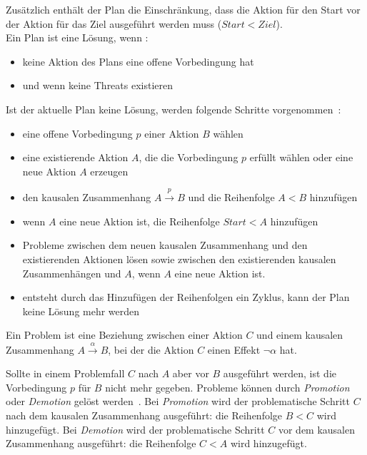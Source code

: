 Zusätzlich enthält der Plan die Einschränkung, dass die Aktion für den Start vor der Aktion für das Ziel ausgeführt werden muss ($Start < Ziel$).\\
Ein Plan ist eine Lösung, wenn \cite{grastien}:
\begin{itemize}
    \item keine Aktion des Plans eine offene Vorbedingung hat
    \item und wenn keine Threats existieren
\end{itemize}
Ist der aktuelle Plan keine Lösung, werden folgende Schritte vorgenommen~\cite{grastien}:
\begin{itemize}
    \item eine offene Vorbedingung $p$ einer Aktion $B$ wählen
    \item eine existierende Aktion $A$, die die Vorbedingung $p$ erfüllt wählen oder eine neue Aktion $A$ erzeugen
    \item den kausalen Zusammenhang $A \xrightarrow{p} B$ und die Reihenfolge $A < B$ hinzufügen
    \item wenn $A$ eine neue Aktion ist, die Reihenfolge $Start < A$ hinzufügen
    \item Probleme zwischen dem neuen kausalen Zusammenhang und den existierenden Aktionen lösen sowie zwischen den existierenden kausalen Zusammenhängen und $A$, wenn $A$ eine neue Aktion ist.
    \item entsteht durch das Hinzufügen der Reihenfolgen ein Zyklus, kann der Plan keine Lösung mehr werden
\end{itemize}
\begin{definition}
    Ein Problem ist eine Beziehung zwischen einer Aktion $C$ und einem kausalen Zusammenhang  $A \xrightarrow{\alpha} B$, bei der die Aktion $C$ einen Effekt $\neg \alpha$ hat.
\end{definition}

Sollte in einem Problemfall $C$ nach $A$ aber vor $B$ ausgeführt werden, ist die Vorbedingung $p$ für $B$ nicht mehr gegeben.
Probleme können durch \emph{Promotion} oder \emph{Demotion} gelöst werden~\cite{dyer_2003}.
Bei \emph{Promotion} wird der problematische Schritt $C$ nach dem kausalen Zusammenhang ausgeführt: die Reihenfolge $B < C$ wird hinzugefügt.
Bei \emph{Demotion} wird der problematische Schritt $C$ vor dem kausalen Zusammenhang ausgeführt: die Reihenfolge $C < A$ wird hinzugefügt.

